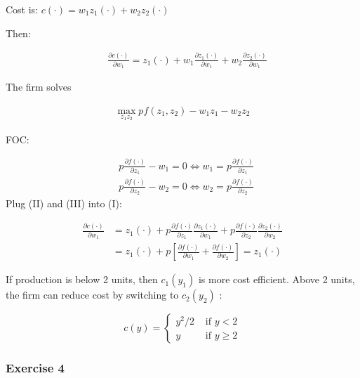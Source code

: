 {{\begin{enumerate}[label=(\alph*)]
{\item 
Cost is: $c(\cdot)=w_{1} z_{1}(\cdot)+w_{2} z_{2}(\cdot)$

Then:

\begin{align*}
    \quad \frac{\partial c(\cdot)}{\partial w_{1}}=z_{1}(\cdot)+w_{1} \frac{\partial z_{1}(\cdot)}{\partial w_{1}}+w_{2} \frac{\partial z_{2}(\cdot)}{\partial w_{1}} \tag{I}
\end{align*}

The firm solves

\begin{align*}
\max_{z_{1} z_{2}} p f\left(z_{1}, z_{2}\right)-w_{1} z_{1}-w_{2} z_{2}
\end{align*}

FOC:

\begin{align*}
& p \frac{\partial f(\cdot)}{\partial z_{1}}-w_{1}=0 \Leftrightarrow w_{1}=p \frac{\partial f(\cdot)}{\partial z_{1}}  \tag{II}\\
& p \frac{\partial f(\cdot)}{\partial z_{2}}-w_{2}=0 \Leftrightarrow w_{2}=p \frac{\partial f(\cdot)}{\partial z_{2}} \tag{III}
\end{align*}
Plug (II) and (III) into (I):

\begin{align*}
\frac{\partial c(\cdot)}{\partial w_{1}} & =z_{1}(\cdot)+p \frac{\partial f(\cdot)}{\partial z_{1}} \frac{\partial z_{1}(\cdot)}{\partial w_{1}}+p \frac{\partial f(\cdot)}{\partial z_{2}} \frac{\partial z_{2}(\cdot)}{\partial w_{2}} \\
& =z_{1}(\cdot)+p\left[\frac{\partial f(\cdot)}{\partial w_{1}}+\frac{\partial f(\cdot)}{\partial w_{2}}\right]=z_{1}(\cdot)
\end{align*}
}
{\item 
If production is below 2 units, then $c_1\left(y_{1}\right)$ is more cost efficient. Above 2 units, the firm can reduce cost by switching to $c_{2}\left(y_{2}\right)$ :

$$
c(y)= \begin{cases}y^{2} / 2 & \text { if } y<2 \\ y & \text { if } y \geqslant 2\end{cases}
$$
}
\end{enumerate}
}
{
\subsubsection*{Exercise 4}

}}
